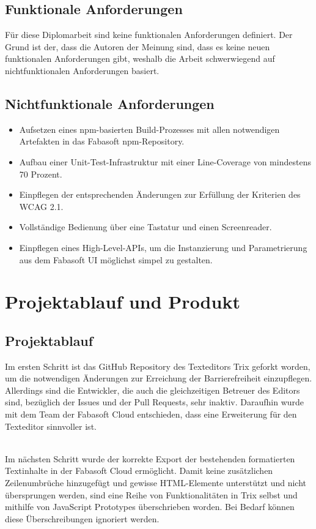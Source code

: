 \subsection{Funktionale Anforderungen}
Für diese Diplomarbeit sind keine funktionalen Anforderungen definiert. Der Grund ist der, dass die Autoren der Meinung sind, dass es keine neuen funktionalen Anforderungen gibt, weshalb die Arbeit schwerwiegend auf nichtfunktionalen Anforderungen basiert.

\subsection{Nichtfunktionale Anforderungen}

\begin{itemize}
	\item Aufsetzen eines npm-basierten Build-Prozesses mit allen notwendigen Artefakten in das Fabasoft npm-Repository.
	\item Aufbau einer Unit-Test-Infrastruktur mit einer Line-Coverage von mindestens 70 Prozent.
	\item Einpflegen der entsprechenden Änderungen zur Erfüllung der Kriterien des WCAG 2.1.
	\item Vollständige Bedienung über eine Tastatur und einen Screenreader.
	\item Einpflegen eines High-Level-APIs, um die Instanzierung und Parametrierung aus dem Fabasoft UI möglichst simpel zu gestalten.
\end{itemize}

\section{Projektablauf und Produkt}
\subsection{Projektablauf}
Im ersten Schritt ist das GitHub Repository des Texteditors Trix geforkt worden, um die notwendigen Änderungen zur Erreichung der Barrierefreiheit einzupflegen. Allerdings sind die Entwickler, die auch die gleichzeitigen Betreuer des Editors sind, bezüglich der Issues und der Pull Requests, sehr inaktiv. Daraufhin wurde mit dem Team der Fabasoft Cloud entschieden, dass eine Erweiterung für den Texteditor sinnvoller ist.

\mbox{}\\Im nächsten Schritt wurde der korrekte Export der bestehenden formatierten Textinhalte in der Fabasoft Cloud ermöglicht. Damit keine zusätzlichen Zeilenumbrüche hinzugefügt und gewisse HTML-Elemente unterstützt und nicht übersprungen werden, sind eine Reihe von Funktionalitäten in Trix selbst und mithilfe von JavaScript Prototypes überschrieben worden. Bei Bedarf können diese Überschreibungen ignoriert werden.

